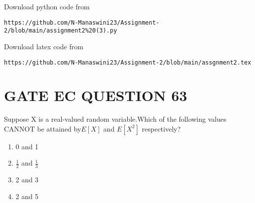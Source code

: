 \documentclass[journal,12pt,twocolumn]{IEEEtran}
\begin{document}
\renewcommand{\thefigure}{\theenumi}
\renewcommand{\thetable}{\theenumi}
Download python code from 
\begin{lstlisting}
https://github.com/N-Manaswini23/Assignment-2/blob/main/assignment2%20(3).py
\end{lstlisting}
%
Download latex code from
\begin{lstlisting}
https://github.com/N-Manaswini23/Assignment-2/blob/main/assgnment2.tex
\end{lstlisting}
%
\section*{GATE EC QUESTION 63}
Suppose X is a real-valued random variable.Which of the following values CANNOT be attained by$ E[X] $ and $ E[X^2] $ respectively?
\begin{enumerate}
\item 0 and 1   
\item  $\frac{1}{2}$ and $\frac{1}{3}$
\item  2 and 3
\item 2 and 5
\end{enumerate}
\end{document}
